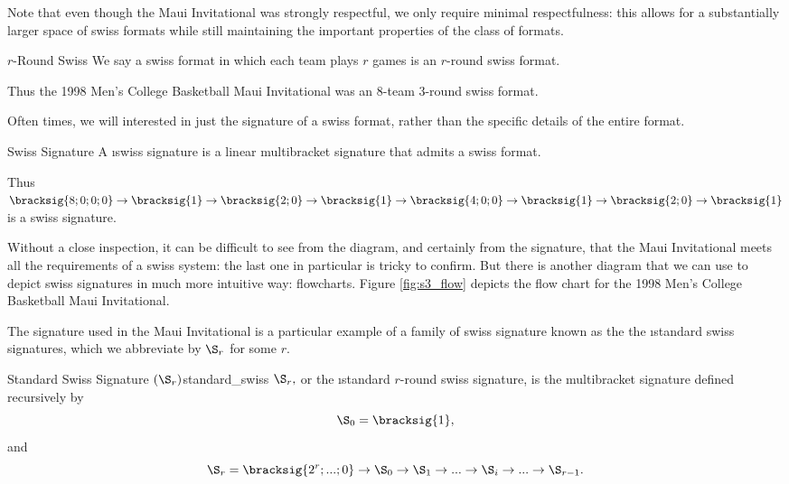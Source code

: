 {    Note that even though the Maui Invitational was strongly respectful, we only require minimal respectfulness: this allows for a substantially larger space of swiss formats while still maintaining the important properties of the class of formats.

    \begin{definition}{$r$-Round Swiss}{}
        We say a swiss format in which each team plays $r$ games is an $r$-round swiss format.
    \end{definition}

    Thus the 1998 Men's College Basketball Maui Invitational was an 8-team 3-round swiss format.

    Often times, we will interested in just the signature of a swiss format, rather than the specific details of the entire format.

    \begin{definition}{Swiss Signature}{}
        A \i{swiss signature} is a linear multibracket signature that admits a swiss format.
    \end{definition}

    Thus $\bracksig{8;0;0;0} \to \bracksig{1} \to \bracksig{2;0} \to \bracksig{1} \to \bracksig{4;0;0} \to \bracksig{1} \to \bracksig{2;0} \to \bracksig{1}$ is a swiss signature.

    Without a close inspection, it can be difficult to see from the diagram, and certainly from the signature, that the Maui Invitational meets all the requirements of a swiss system: the last one in particular is tricky to confirm. But there is another diagram that we can use to depict swiss signatures in much more intuitive way: flowcharts. Figure \ref{fig:s3_flow} depicts the flow chart for the 1998 Men's College Basketball Maui Invitational. %



    The signature used in the Maui Invitational is a particular example of a family of swiss signature known as the the \i{standard swiss signatures}, which we abbreviate by $\S_r$ for some $r$.

    \begin{definition}{Standard Swiss Signature $(\S_r)$}{standard_swiss}
        $\S_r,$ or the \i{standard $r$-round swiss signature}, is the multibracket signature defined recursively by $$\S_0 = \bracksig{1},$$ and
        $$\S_r = \bracksig{2^r; ...; 0} \to \S_{0} \to \S_1 \to ... \to \S_i \to ... \to \S_{r-1}.$$
    \end{definition}

}
